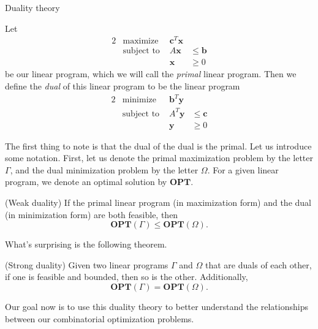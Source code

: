 \begin{section}{Duality theory}
	\begin{definition}
		Let 
		\begin{alignat*}{2}
			& \text{maximize } & \mathbf{c}^{T}\mathbf{x} \\
			& \text{subject to } & A\mathbf{x} & \leq \mathbf{b} \\
			&& \mathbf{x} &\geq 0
		\end{alignat*}
		be our linear program, which we will call the \emph{primal} linear program. Then we 
		define the \emph{dual} of this linear program to be the linear program
		\begin{alignat*}{2}
			& \text{minimize } & \mathbf{b}^{T}\mathbf{y} \\
			& \text{subject to } & A^{T}\mathbf{y} & \leq \mathbf{c} \\
			&& \mathbf{y} &\geq 0
		\end{alignat*}
	\end{definition}
	The first thing to note is that the dual of the dual is the primal. Let us introduce some 
	notation. First, let us denote the primal maximization problem by the letter $\Gamma$, and 
	the dual minimization problem by the letter $\Omega$. For a given linear program, we denote 
	an optimal solution by $\mathbf{OPT}$. 

	\begin{theorem}{(Weak duality)}
		If the primal linear program (in maximization form) and the dual (in minimization 
		form) are both feasible, then 
		\[
			\mathbf{OPT}(\Gamma) \leq \mathbf{OPT}(\Omega).
		\]
	\end{theorem}
	What's surprising is the following theorem.

	\begin{theorem}{(Strong duality)}
		Given two linear programs $\Gamma$ and $\Omega$ that are duals of each other, if one is 
		feasible and bounded, then so is the other. Additionally, 
		\[
			\mathbf{OPT}(\Gamma) = \mathbf{OPT}(\Omega).
		\]
	\end{theorem}
	Our goal now is to use this duality theory to better understand the relationships between 
	our combinatorial optimization problems.


\end{section}
